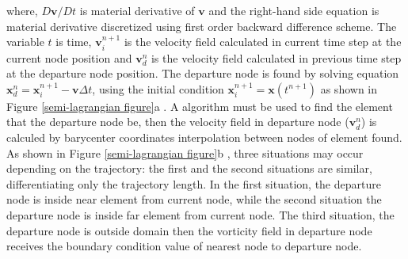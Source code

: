 \documentclass[10pt,fleqn,a4paper,twoside]{article}
\begin{document}
\noindent
where, 
$D\textbf{v}/Dt$ is material derivative of $\textbf{v}$ and
the right-hand side equation is material derivative discretized using first order backward difference scheme.
The variable $t$ is time, 
$\textbf{v}_{i}^{n+1}$ is the velocity field calculated in current time step at the current node position and
$\textbf{v}_{d}^{n}$ is the velocity field calculated in previous time step at the departure node position.
The departure node is found by solving equation $\mathbf{x}_{d}^{n} = \mathbf{x}_{i}^{n+1} - \mathbf{v} \Delta t$, using the initial condition $\mathbf{x}_{i}^{n+1} = \mathbf{x}(t^{n+1})$ as shown in Figure \ref{semi-lagrangian figure}a . 
A algorithm must be used to find the element that the departure node be, then the velocity field in departure node ($\textbf{v}_{d}^{n}$) is calculed by barycenter coordinates interpolation between nodes of element found.
As shown in Figure \ref{semi-lagrangian figure}b , three situations may occur depending on the trajectory: the first and the second situations are similar, differentiating only the trajectory length. 
In the first situation, the departure node is inside near element from current node, while the second situation the departure node is inside far element from current node. 
The third situation, the departure node is outside domain then the vorticity field in departure node receives the boundary condition value of nearest node to departure node.
\end{document}
